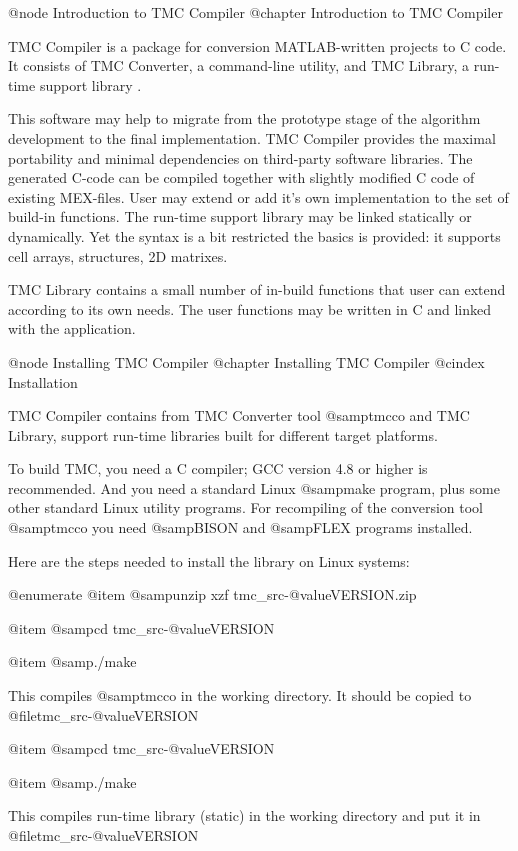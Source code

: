 @node Introduction to TMC Compiler
@chapter Introduction to TMC Compiler

TMC Compiler is a package for conversion MATLAB-written projects to  C code. It consists of TMC Converter, a command-line utility, and TMC Library, a run-time support library . 

This software may help to migrate from the prototype stage of the algorithm development  to the final implementation. TMC Compiler provides the maximal portability and minimal dependencies on third-party software libraries.
The generated C-code can be compiled together with slightly modified C code of existing MEX-files. User may extend or add it's own implementation to the set of build-in functions. The run-time support library may be linked statically or dynamically. Yet the syntax is a bit restricted the basics is provided:  it supports cell arrays, structures, 2D matrixes.

TMC Library contains a small number of  in-build functions that user can extend according to its own needs.
The user functions may be written in C and linked with the application. 


@node Installing TMC Compiler
@chapter Installing TMC Compiler
@cindex Installation

TMC Compiler contains from TMC Converter tool @samp{tmcco} and TMC Library, support run-time libraries built for different
target platforms. 

To build TMC, you need a C compiler;
GCC version 4.8 or higher is recommended. And you need a
standard Linux @samp{make} program, plus some other standard Linux utility
programs. For recompiling of the conversion tool @samp{tmcco} you need  @samp{BISON} and  @samp{FLEX} programs installed.

Here are the steps needed to install the library on Linux systems:

@enumerate
@item
@samp{unzip xzf tmc_src-@value{VERSION}.zip}

@item
@samp{cd tmc_src-@value{VERSION}\src\tmcwood}

@item
@samp{./make}

This compiles @samp{tmcco} in the working directory. It should be copied to @file{tmc_src-@value{VERSION}\bin}

@item
@samp{cd tmc_src-@value{VERSION}\src\tmcruntime}

@item
@samp{./make}

This compiles run-time library (static) in the working directory and put it in @file{tmc_src-@value{VERSION}\lib}


